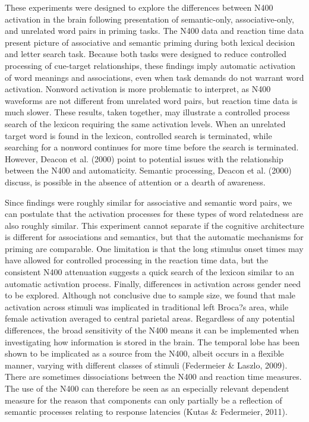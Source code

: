 \documentclass[english,man]{apa6}
\theoremstyle{definition}
\theoremstyle{definition}
\theoremstyle{definition}
\theoremstyle{remark}
\begin{document}
These experiments were designed to explore the differences between N400
activation in the brain following presentation of semantic-only,
associative-only, and unrelated word pairs in priming tasks. The N400
data and reaction time data present picture of associative and semantic
priming during both lexical decision and letter search task. Because
both tasks were designed to reduce controlled processing of cue-target
relationships, these findings imply automatic activation of word
meanings and associations, even when task demands do not warrant word
activation. Nonword activation is more problematic to interpret, as N400
waveforms are not different from unrelated word pairs, but reaction time
data is much slower. These results, taken together, may illustrate a
controlled process search of the lexicon requiring the same activation
levels. When an unrelated target word is found in the lexicon,
controlled search is terminated, while searching for a nonword continues
for more time before the search is terminated. However, Deacon et al.
(2000) point to potential issues with the relationship between the N400
and automaticity. Semantic processing, Deacon et al. (2000) discuss, is
possible in the absence of attention or a dearth of awareness.

Since findings were roughly similar for associative and semantic word
pairs, we can postulate that the activation processes for these types of
word relatedness are also roughly similar. This experiment cannot
separate if the cognitive architecture is different for associations and
semantics, but that the automatic mechanisms for priming are comparable.
One limitation is that the long stimulus onset times may have allowed
for controlled processing in the reaction time data, but the consistent
N400 attenuation suggests a quick search of the lexicon similar to an
automatic activation process. Finally, differences in activation across
gender need to be explored. Although not conclusive due to sample size,
we found that male activation across stimuli was implicated in
traditional left Broca?s area, while female activation averaged to
central parietal areas. Regardless of any potential differences, the
broad sensitivity of the N400 means it can be implemented when
investigating how information is stored in the brain. The temporal lobe
has been shown to be implicated as a source from the N400, albeit occurs
in a flexible manner, varying with different classes of stimuli
(Federmeier \& Laszlo, 2009). There are sometimes dissociations between
the N400 and reaction time measures. The use of the N400 can therefore
be seen as an especially relevant dependent measure for the reason that
components can only partially be a reflection of semantic processes
relating to response latencies (Kutas \& Federmeier, 2011).
\end{document}
